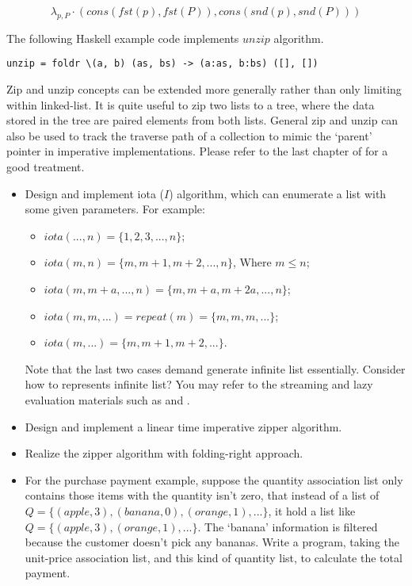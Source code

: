 \documentclass[UTF8]{article}
\begin{document}
\[
\lambda_{p, P} \cdot (cons(fst(p), fst(P)), cons(snd(p), snd(P)))
\]

The following Haskell example code implements $unzip$ algorithm.

\lstset{language=Haskell}
\begin{lstlisting}
unzip = foldr \(a, b) (as, bs) -> (a:as, b:bs) ([], [])
\end{lstlisting}

Zip and unzip concepts can be extended more generally rather than only limiting within linked-list. It is quite
useful to zip two lists to a tree, where the data stored in the tree are paired elements from both lists.
General zip and unzip can also be used to track the traverse path of a collection to mimic the `parent' pointer
in imperative implementations. Please refer to the last chapter of \cite{learn-haskell} for a good treatment.

\begin{Exercise}
\begin{itemize}
\item Design and implement iota ($I$) algorithm, which can enumerate a list with some given parameters. For example:
  \begin{itemize}
  \item $iota(..., n) = \{1, 2, 3, ..., n\}$;
  \item $iota(m, n) = \{m, m+1, m+2, ..., n\}$, Where $m \leq n$;
  \item $iota(m, m+a, ..., n) = \{m, m+a, m+2a, ..., n \}$;
  \item $iota(m, m, ...) = repeat(m) = \{m, m, m, ...\}$;
  \item $iota(m, ...) = \{m, m+1, m+2, ... \}$.
  \end{itemize}
  Note that the last two cases demand generate infinite list essentially. Consider how to represents infinite list?
  You may refer to the streaming and lazy evaluation materials such as \cite{SICP} and \cite{learn-haskell}.
\item Design and implement a linear time imperative zipper algorithm.
\item Realize the zipper algorithm with folding-right approach.
\item For the purchase payment example, suppose the quantity association list only contains those items with
the quantity isn't zero, that instead of a list of $Q = \{(apple, 3), (banana, 0), (orange, 1), ...\}$, it
hold a list like $Q = \{(apple, 3), (orange, 1), ...\}$. The `banana' information is filtered because the customer
doesn't pick any bananas. Write a program, taking the unit-price association list, and this kind of quantity
list, to calculate the total payment.
\end{itemize}
\end{Exercise}
\end{document}
